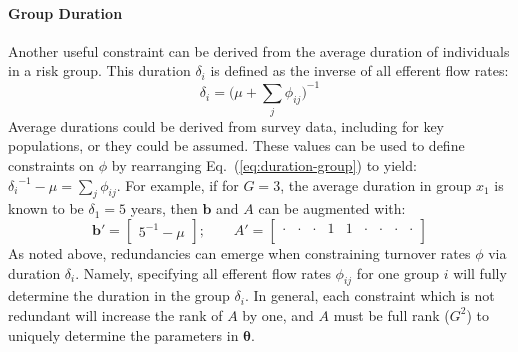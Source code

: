 \paragraph{Group Duration}
Another useful constraint can be derived from
the average duration of individuals in a risk group.
This duration $\delta_i$ is defined as the inverse of all efferent flow rates:
\begin{equation}\label{eq:duration-group}
\delta_i = {\bigg(\mu + \sum_{j}{\phi_{ij}}\bigg)}^{-1}
\end{equation}
Average durations could be derived from survey data, including for key populations, %
or they could be assumed.
These values can be used to define constraints on $\phi$ by
rearranging Eq.~(\ref{eq:duration-group}) to yield:
${\delta_{i}}^{-1} - \mu = \sum_{j}{\phi_{ij}}$.
For example, if for $G = 3$,
the average duration in group $x_1$ is known to be $\delta_1 = 5$ years,
then $\bm{b}$ and $A$ can be augmented with:
\begin{equation}
\bm{b}' = \left[\begin{array}{c}
{5}^{-1} - \mu
\end{array}\right];\qquad
A' = \left[\begin{array}{ccccccccc}
\cdot & \cdot & \cdot & 1 & 1 & \cdot & \cdot & \cdot & \cdot \\
\end{array}\right]
\end{equation}
As noted above, redundancies can emerge
when constraining turnover rates $\phi$ via duration $\delta_i$.
Namely, specifying all efferent flow rates $\phi_{ij}$ for one group $i$
will fully determine the duration in the group $\delta_i$.
In general, each constraint which is not redundant will increase the rank of $A$ by one,
and $A$ must be full rank ($G^2$) to uniquely determine the parameters in $\bm{\theta}$.
